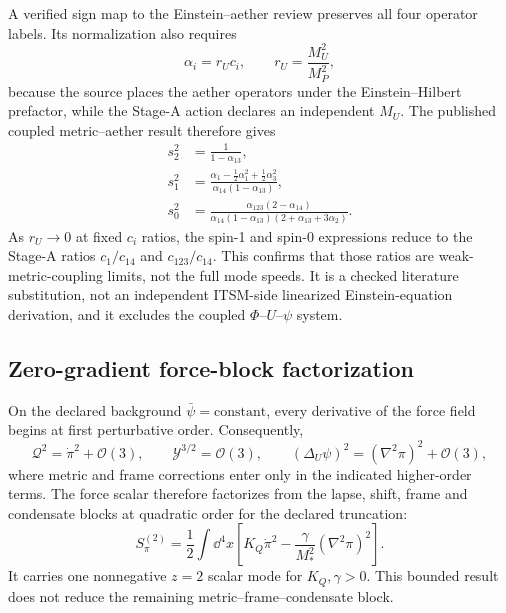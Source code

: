 A verified sign map to the Einstein--aether review
\cite{elingjacobsonmattingly2004} preserves all four operator labels.  Its
normalization also requires
\begin{equation}
 \alpha_i=r_Uc_i,\qquad r_U=\frac{M_U^2}{M_P^2},
 \label{eq:aether-normalization}
\end{equation}
because the source places the aether operators under the Einstein--Hilbert
prefactor, while the Stage-A action declares an independent $M_U$.  The
published coupled metric--aether result therefore gives
\begin{align}
 s_2^2&=\frac{1}{1-\alpha_{13}},\\
 s_1^2&=\frac{\alpha_1-\tfrac12\alpha_1^2+\tfrac12\alpha_3^2}
 {\alpha_{14}(1-\alpha_{13})},\\
 s_0^2&=\frac{\alpha_{123}(2-\alpha_{14})}
 {\alpha_{14}(1-\alpha_{13})(2+\alpha_{13}+3\alpha_2)}.
 \label{eq:aether-speeds}
\end{align}
As $r_U\to0$ at fixed $c_i$ ratios, the spin-1 and spin-0 expressions
reduce to the Stage-A ratios $c_1/c_{14}$ and $c_{123}/c_{14}$.  This confirms
that those ratios are weak-metric-coupling limits, not the full mode speeds.
It is a checked literature substitution, not an independent ITSM-side
linearized Einstein-equation derivation, and it excludes the coupled
$\Phi$--$U$--$\psi$ system.

\subsection{Zero-gradient force-block factorization}

On the declared background $\bar\psi=\text{constant}$, every derivative of
the force field begins at first perturbative order.  Consequently,
\begin{equation}
 \mathcal Q^2=\dot\pi^2+\mathcal O(3),\qquad
 \mathcal Y^{3/2}=\mathcal O(3),\qquad
 (\Delta_U\psi)^2=(\nabla^2\pi)^2+\mathcal O(3),
\end{equation}
where metric and frame corrections enter only in the indicated higher-order
terms.  The force scalar therefore factorizes from the lapse, shift, frame and
condensate blocks at quadratic order for the declared truncation:
\begin{equation}
 S_\pi^{(2)}=\frac12\int\dd^4x\left[
 K_Q\dot\pi^2-\frac{\gamma}{M_*^2}(\nabla^2\pi)^2\right].
 \label{eq:zero-gradient-force-block}
\end{equation}
It carries one nonnegative $z=2$ scalar mode for $K_Q,\gamma>0$.  This bounded
result does not reduce the remaining metric--frame--condensate block.

